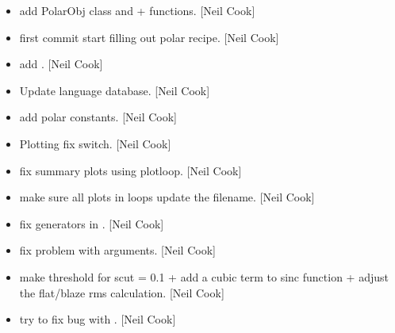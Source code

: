 \documentclass[a4paper,10pt,english]{report}
\begin{document}
\label{\detokenize{misc/changelog:id63}}\begin{itemize}
\item {} 
 \sphinxhyphen{} add PolarObj class and 
+  functions. {[}Neil Cook{]}

\item {} 
 \sphinxhyphen{} first commit \sphinxhyphen{} start filling out
polar recipe. {[}Neil Cook{]}

\item {} 
 \sphinxhyphen{} add .
{[}Neil Cook{]}

\item {} 
Update language database. {[}Neil Cook{]}

\item {} 
 \sphinxhyphen{} add polar constants. {[}Neil
Cook{]}

\item {} 
Plotting \sphinxhyphen{} fix  switch. {[}Neil Cook{]}

\item {} 
 \sphinxhyphen{} fix summary plots using plotloop. {[}Neil Cook{]}

\item {} 
 \sphinxhyphen{} make sure all plots in loops update the
filename. {[}Neil Cook{]}

\item {} 
 \sphinxhyphen{} fix generators in
. {[}Neil Cook{]}

\item {} 
 \sphinxhyphen{} fix problem with  arguments. {[}Neil
Cook{]}

\item {} 
 \sphinxhyphen{} make threshold for scut = 0.1 + add a cubic term to sinc
function + adjust the flat/blaze rms calculation. {[}Neil Cook{]}

\item {} 
 \sphinxhyphen{} try to fix bug with . {[}Neil
Cook{]}


\end{itemize}
\end{document}
